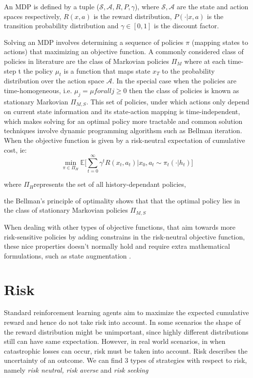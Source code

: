 An MDP is defined by a tuple ($\mathcal{S,A},R,P,\gamma$), where $\mathcal{S,A}$ are the
state and action spaces respectively, $R(x,a)$ is the reward distribution, $P(\cdot |x,a)$ is
the transition probability distribution and $\gamma \in [0,1]$ is the discount factor.  

Solving an MDP involves determining a sequence of policies $\pi$ (mapping states to actions)
that maximizing an objective function.
A commonly considered class of policies in literature are the class of Markovian policies $\Pi_M$ where
at each time-step t the policy $\mu_t$ is a function that maps state $x_T$ to the probability distribution over the action
space $\mathcal{A}$. 
In the special case when the policies are time-homogeneous, i.e. $\mu_j = \mu for all j \geq 0$ then the
class of policies is known as stationary Markovian $\Pi_{M,S}$. This set of policies,
under which actions only depend on current state information and its state-action mapping is time-independent, 
which makes solving for an optimal policy more tractable and common solution techniques involve dynamic programming algorithsm
such as Bellman iteration.
When the objective function is given by a risk-neutral expectation of cumulative cost,
ie:
\begin{equation}
    \underset{\pi \in \Pi_H}{\min} \mathbb E  \big [  \sum_{t=0}^{\infty} \gamma^t R(x_t,a_t) | x_0, a_t \sim \pi_t(\cdot |h_t)  \big]
\end{equation} 

where $ \Pi_H$represents the set of all history-dependant policies,

the Bellman's principle of optimality \citep{Bertsekas1995} shows that that the optimal policy lies in the class of stationary Markovian
policies $\Pi_{M,S}$

When dealing with other types of objective functions, that aim towards more risk-sensitive
policies by adding constrains in the risk-neutral objective function, these nice properties doesn't normally hold
and require extra mathematical formulations, such as state augmentation \citep{Chow2015}.



\section{Risk}
Standard reinforcement learning agents aim to maximize the expected cumulative reward and hence
do not take risk into account. In some scenarios the shape of the reward distribution might be unimportant,
since highly different distributions still can have same expectation. However, in real world scenarios, in  when catastrophic losses can occur,
risk must be taken into account.
Risk describes the uncertainty of an outcome.
We can find 3 types of strategies with respect to risk, namely \textit{risk neutral, risk averse} and \textit{risk seeking}

